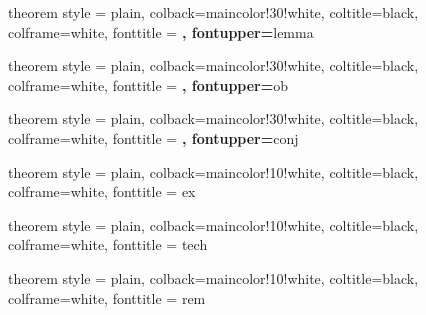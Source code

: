 {theorem style = plain, colback=maincolor!30!white, coltitle=black, colframe=white, fonttitle = \upshape\bfseries,  fontupper=\itshape}{lemma}

 {theorem style = plain, colback=maincolor!30!white, coltitle=black, colframe=white, fonttitle = \upshape\bfseries,  fontupper=\itshape}{ob}

 {theorem style = plain, colback=maincolor!30!white, coltitle=black, colframe=white, fonttitle = \upshape\bfseries,  fontupper=\itshape}{conj}

 {theorem style = plain, colback=maincolor!10!white, coltitle=black, colframe=white, fonttitle = \upshape\itshape}{ex}

 {theorem style = plain, colback=maincolor!10!white, coltitle=black, colframe=white, fonttitle = \upshape\itshape}{tech}

 {theorem style = plain, colback=maincolor!10!white, coltitle=black, colframe=white, fonttitle = \upshape\itshape}{rem}

\DeclareMathOperator{\im}{im}
\DeclareMathOperator{\coker}{coker}
\DeclareMathOperator{\cone}{cone}
\DeclareMathOperator{\Tot}{Tot}
\DeclareMathOperator{\Hom}{Hom}
\DeclareMathOperator{\Ext}{Ext}
\DeclareMathOperator{\lExt}{\mathcal{E}\mathit{xt}} %
\DeclareMathOperator{\lHom}{\mathcal{H}\mathit{om}} %
\newcommand{\dL}{\mathbf{L}} %
\newcommand{\dR}{\mathbf{R}} %
\newcommand{\mL}{\mathbb{L}} %
\newcommand{\mR}{\mathbb{R}} %
\DeclareMathOperator{\RHom}{\dR Hom} %
\DeclareMathOperator{\RlHom}{\dR\mathcal{H}\mathit{om}} %
\DeclareMathOperator{\RG}{\dR\Gamma} %
\newcommand{\Lotimes}{\otimes^\dL} %
\newcommand{\lperp}[1]{\prescript{\perp}{}{#1}} %
\DeclareMathOperator{\Spec}{Spec}
\DeclareMathOperator{\Proj}{Proj}
\DeclareMathOperator{\Pic}{Pic}
\DeclareMathOperator{\Coh}{Coh}
\DeclareMathOperator{\QCoh}{QCoh}
\DeclareMathOperator{\Perf}{Perf}
\DeclareMathOperator{\DPerf}{\mathfrak{Perf}}
\newcommand{\MF}{\mathrm{MF}}
\newcommand{\Ab}{\mathrm{Ab}}

